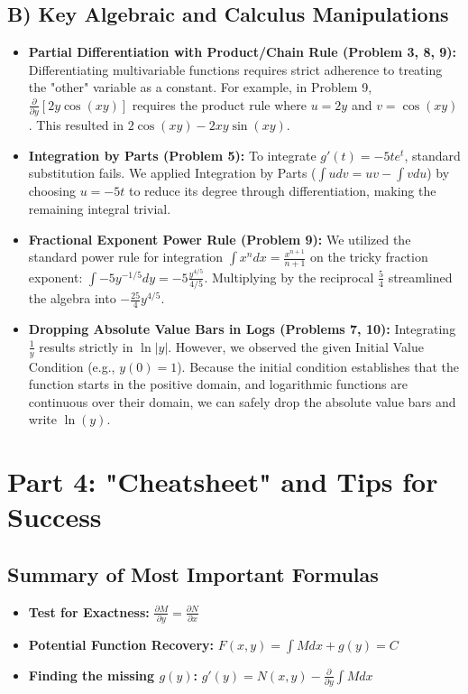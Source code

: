 \documentclass[11pt]{article}
\begin{document}
\subsection{B) Key Algebraic and Calculus Manipulations}
\begin{itemize}
    \item \textbf{Partial Differentiation with Product/Chain Rule (Problem 3, 8, 9):} Differentiating multivariable functions requires strict adherence to treating the "other" variable as a constant. For example, in Problem 9, $\frac{\partial}{\partial y}[2y \cos(xy)]$ requires the product rule where $u = 2y$ and $v = \cos(xy)$. This resulted in $2\cos(xy) - 2xy \sin(xy)$.
    \item \textbf{Integration by Parts (Problem 5):} To integrate $g'(t) = -5t e^t$, standard substitution fails. We applied Integration by Parts ($\int u dv = uv - \int v du$) by choosing $u = -5t$ to reduce its degree through differentiation, making the remaining integral trivial.
    \item \textbf{Fractional Exponent Power Rule (Problem 9):} We utilized the standard power rule for integration $\int x^n dx = \frac{x^{n+1}}{n+1}$ on the tricky fraction exponent: $\int -5y^{-1/5} dy = -5 \frac{y^{4/5}}{4/5}$. Multiplying by the reciprocal $\frac{5}{4}$ streamlined the algebra into $-\frac{25}{4}y^{4/5}$.
    \item \textbf{Dropping Absolute Value Bars in Logs (Problems 7, 10):} Integrating $\frac{1}{y}$ results strictly in $\ln|y|$. However, we observed the given Initial Value Condition (e.g., $y(0) = 1$). Because the initial condition establishes that the function starts in the positive domain, and logarithmic functions are continuous over their domain, we can safely drop the absolute value bars and write $\ln(y)$.
\end{itemize}

\newpage
\section{Part 4: "Cheatsheet" and Tips for Success}

\subsection{Summary of Most Important Formulas}
\begin{itemize}
    \item \textbf{Test for Exactness:} $\frac{\partial M}{\partial y} = \frac{\partial N}{\partial x}$
    \item \textbf{Potential Function Recovery:} $F(x,y) = \int M dx + g(y) = C$ 
    \item \textbf{Finding the missing $g(y)$:} $g'(y) = N(x,y) - \frac{\partial}{\partial y} \int M dx$
\end{itemize}
\end{document}
